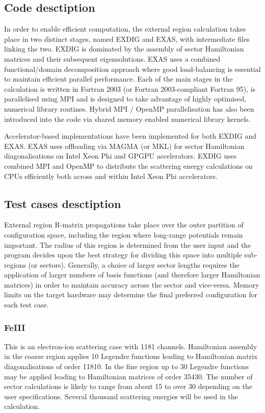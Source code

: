 \subsection{Code desctiption}
In order to enable efficient computation, the external region calculation takes place in two distinct stages, named EXDIG and EXAS, with intermediate files linking the two. EXDIG is dominated by the assembly of sector Hamiltonian matrices and their subsequent eigensolutions. EXAS uses a combined functional/domain decomposition approach where good load-balancing is essential to maintain efficient parallel performance. Each of the main stages in the calculation is written in Fortran 2003 (or Fortran 2003-compliant Fortran 95), is parallelised using MPI and is designed to take advantage of highly optimised, numerical library routines. Hybrid MPI / OpenMP parallelisation has also been introduced into the code via shared memory enabled numerical library kernels.

Accelerator-based implementations have been implemented for both EXDIG and EXAS. EXAS uses offloading via MAGMA (or MKL) for sector Hamiltonian diagonalisations on Intel Xeon Phi and GPGPU accelerators. EXDIG uses combined MPI and OpenMP to distribute the scattering energy calculations on CPUs efficiently both across and within Intel Xeon Phi accelerators.

\subsection{Test cases desctiption}
External region R-matrix propagations take place over the outer partition of configuration space, including the region where long-range potentials remain important. The radius of this region is determined from the user input and the program decides upon the best strategy for dividing this space into multiple sub-regions (or sectors). Generally, a choice of larger sector lengths requires the application of larger numbers of basis functions (and therefore larger Hamiltonian matrices) in order to maintain accuracy across the sector and vice-versa. Memory limits on the target hardware may determine the final preferred configuration for each test case.

\subsubsection{FeIII}
This is an electron-ion scattering case with 1181 channels. Hamiltonian assembly in the coarse region applies 10 Legendre functions leading to Hamiltonian matrix diagonalisations of order 11810. In the fine region up to 30 Legendre functions may be applied leading to Hamiltonian matrices of order 35430. The number of sector calculations is likely to range from about 15 to over 30 depending on the user specifications. Several thousand scattering energies will be used in the calculation.


